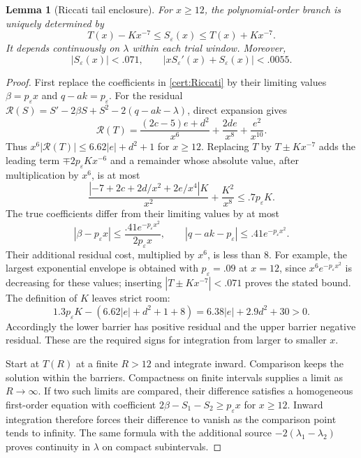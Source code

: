 \documentclass[11pt,a4paper]{article}
\numberwithin{equation}{section}
\newtheorem{lemma}[theorem]{Lemma}
\theoremstyle{definition}
\theoremstyle{remark}
\begin{document}
\begin{lemma}[Riccati tail enclosure]\label{cert:tail-enclosure}
For $x\ge12$, the polynomial-order branch is uniquely determined by
\[
 T(x)-Kx^{-7}\le S_\varepsilon(x)\le T(x)+Kx^{-7}.
\]
It depends continuously on $\lambda$ within each trial window.  Moreover,
\begin{equation}\label{cert:tail-derivatives}
 |S_\varepsilon(x)|<.071,\qquad
 |xS_\varepsilon'(x)+S_\varepsilon(x)|<.0055.
\end{equation}
\end{lemma}
\begin{proof}
First replace the coefficients in \eqref{cert:Riccati} by their limiting
values $\beta=p_\varepsilon x$ and $q-ak=p_\varepsilon$.
For the residual $\mathcal R(S)=S'-2\beta S+S^2-2(q-ak-\lambda)$,
direct expansion gives
\[
 \mathcal R(T)=\frac{(2c-5)e+d^2}{x^6}
                    +\frac{2de}{x^8}+\frac{e^2}{x^{10}}.
\]
Thus $x^6|\mathcal R(T)|\le6.62|e|+d^2+1$ for $x\ge12$.
Replacing $T$ by $T\pm Kx^{-7}$ adds the leading term
$\mp2p_\varepsilon Kx^{-6}$ and a remainder whose absolute value, after
multiplication by $x^6$, is at most
\[
 \frac{|-7+2c+2d/x^2+2e/x^4|K}{x^2}+\frac{K^2}{x^8}
 \le .7p_\varepsilon K.
\]
The true coefficients differ from their limiting values by at most
\[
 |\beta-p_\varepsilon x|
 \le\frac{.41e^{-p_\varepsilon x^2}}{2p_\varepsilon x},
 \qquad |q-ak-p_\varepsilon|\le .41e^{-p_\varepsilon x^2}.
\]
Their additional residual cost, multiplied by $x^6$, is less than $8$.
For example, the largest exponential envelope is obtained with
$p_\varepsilon=.09$ at $x=12$, since
$x^6e^{-p_\varepsilon x^2}$ is decreasing for these values; inserting
$|T\pm Kx^{-7}|<.071$ proves the stated bound.
The definition of $K$ leaves strict room:
\[
 1.3p_\varepsilon K-(6.62|e|+d^2+1+8)
 =6.38|e|+2.9d^2+30>0.
\]
Accordingly the lower barrier has positive residual and the upper barrier
negative residual.  These are the required signs for integration from larger
to smaller $x$.

Start at $T(R)$ at a finite $R>12$ and integrate inward.  Comparison keeps the
solution within the barriers.  Compactness on finite intervals supplies a
limit as $R\to\infty$.  If two such limits are compared, their difference
satisfies a homogeneous first-order equation with coefficient
$2\beta-S_1-S_2\ge p_\varepsilon x$ for $x\ge12$.  Inward integration
therefore forces their difference to vanish as the comparison point tends to
infinity.  The same formula with the additional source
$-2(\lambda_1-\lambda_2)$ proves continuity in $\lambda$ on compact
subintervals.


\end{proof}
\end{document}
